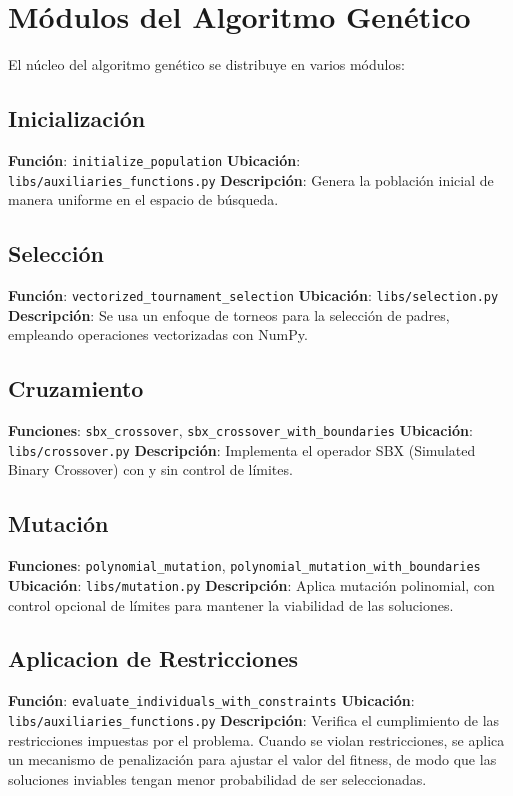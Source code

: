 \section{M\'odulos del Algoritmo Gen\'etico}

El n\'ucleo del algoritmo gen\'etico se distribuye en varios m\'odulos:

\subsection{Inicializaci\'on}
\textbf{Funci\'on}: \texttt{initialize\_population}  
\textbf{Ubicaci\'on}: \texttt{libs/auxiliaries\_functions.py}  
\textbf{Descripci\'on}: Genera la poblaci\'on inicial de manera uniforme en el espacio de b\'usqueda.

\subsection{Selecci\'on}
\textbf{Funci\'on}: \texttt{vectorized\_tournament\_selection}  
\textbf{Ubicaci\'on}: \texttt{libs/selection.py}  
\textbf{Descripci\'on}: Se usa un enfoque de torneos para la selecci\'on de padres, empleando operaciones vectorizadas con NumPy.

\subsection{Cruzamiento}
\textbf{Funciones}: \texttt{sbx\_crossover}, \texttt{sbx\_crossover\_with\_boundaries}  
\textbf{Ubicaci\'on}: \texttt{libs/crossover.py}  
\textbf{Descripci\'on}: Implementa el operador SBX (Simulated Binary Crossover) con y sin control de l\'imites.

\subsection{Mutaci\'on}
\textbf{Funciones}: \texttt{polynomial\_mutation}, \texttt{polynomial\_mutation\_with\_boundaries}  
\textbf{Ubicaci\'on}: \texttt{libs/mutation.py}  
\textbf{Descripci\'on}: Aplica mutaci\'on polinomial, con control opcional de l\'imites para mantener la viabilidad de las soluciones.

\subsection{Aplicacion de Restricciones}
\textbf{Función}: \texttt{evaluate\_individuals\_with\_constraints} 
\textbf{Ubicaci\'on}: \texttt{libs/auxiliaries\_functions.py}  
\textbf{Descripción}: Verifica el cumplimiento de las restricciones impuestas por el problema. Cuando se violan restricciones, se aplica un mecanismo de penalización para ajustar el valor del fitness, de modo que las soluciones inviables tengan menor probabilidad de ser seleccionadas.

